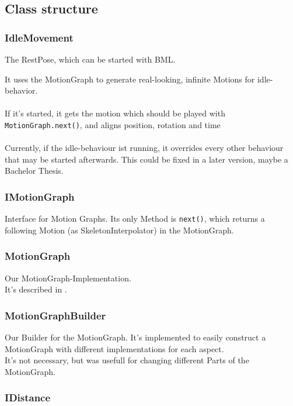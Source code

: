 \documentclass[a4paper,10pt,titlepage,bibliography=totocnumbered]{scrartcl}
\begin{document}
\subsection{Class structure}

\subsubsection{IdleMovement}

The RestPose, which can be started with BML.

It uses the MotionGraph to generate real-looking, infinite Motions for idle-behavior.
\\\\
If it's started, it gets the motion which should be played with \lstinline[]{MotionGraph.next()}, and aligns position, rotation and time
\\\\
Currently, if the idle-behaviour ist running, it overrides every other behaviour that may be started afterwards. This could be fixed in a later version, maybe a Bachelor Thesis.

\subsubsection{IMotionGraph}

Interface for Motion Graphs.
Its only Method is \lstinline[]{next()}, which returns a following Motion (as SkeletonInterpolator) in the MotionGraph.

\subsubsection{MotionGraph}

Our MotionGraph-Implementation.
\\
It's described in .

\subsubsection{MotionGraphBuilder}

Our Builder for the MotionGraph. It's implemented to easily construct a MotionGraph with different implementations for each aspect.
\\
It's not necessary, but was usefull for changing different Parts of the MotionGraph.

\subsubsection{IDistance}
\end{document}
